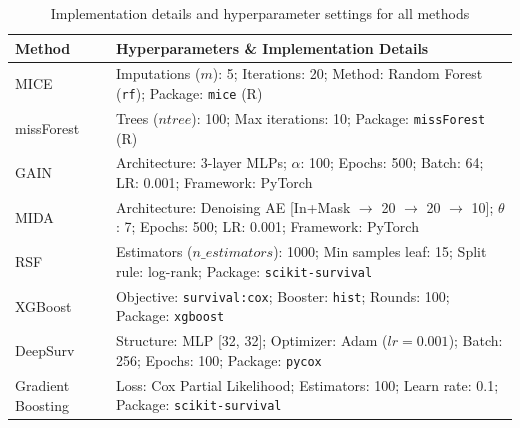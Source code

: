\documentclass[pdflatex,sn-mathphys-num]{sn-jnl}%
\theoremstyle{thmstyleone}%
\theoremstyle{thmstyletwo}%
\theoremstyle{thmstylethree}%
\begin{document}
\begin{appendices}
\begin{table}[ht]
\centering
\caption{Implementation details and hyperparameter settings for all methods}
\label{tab:implementation_details}
\tiny
\renewcommand{\arraystretch}{0.8}
\begin{tabular}{@{}lp{12cm}@{}}
\toprule
\textbf{Method} & \textbf{Hyperparameters \& Implementation Details} \\
\midrule
MICE \cite{van2011mice} & Imputations ($m$): 5; Iterations: 20; Method: Random Forest (\texttt{rf}); Package: \texttt{mice} (R) \\
\midrule
missForest \cite{stekhoven2012missforest} & Trees ($ntree$): 100; Max iterations: 10; Package: \texttt{missForest} (R) \\
\midrule
GAIN \cite{yoon2018gain} & Architecture: 3-layer MLPs; $\alpha$: 100; Epochs: 500; Batch: 64; LR: 0.001; Framework: PyTorch \\
\midrule
MIDA \cite{gondara2018mida} & Architecture: Denoising AE [In+Mask $\to$ 20 $\to$ 20 $\to$ 10]; $\theta$: 7; Epochs: 500; LR: 0.001; Framework: PyTorch \\
\midrule
RSF \cite{ishwaran2008random} & Estimators ($n\_estimators$): 1000; Min samples leaf: 15; Split rule: log-rank; Package: \texttt{scikit-survival} \\
\midrule
XGBoost \cite{chen2016xgboost} & Objective: \texttt{survival:cox}; Booster: \texttt{hist}; Rounds: 100; Package: \texttt{xgboost} \\
\midrule
DeepSurv \cite{katzman2018deepsurv} & Structure: MLP [32, 32]; Optimizer: Adam ($lr=0.001$); Batch: 256; Epochs: 100; Package: \texttt{pycox} \\
\midrule
Gradient Boosting \cite{hothorn2010model} & Loss: Cox Partial Likelihood; Estimators: 100; Learn rate: 0.1; Package: \texttt{scikit-survival} \\
\bottomrule
\end{tabular}
\end{table}




\end{appendices}


\end{document}
